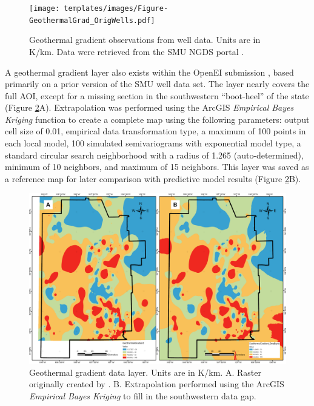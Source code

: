 \begin{figure}[H]
\centering
\texttt{[image: templates/images/Figure-GeothermalGrad\_OrigWells.pdf]}
\caption[Geothermal gradient data layer]{Geothermal gradient observations from well data. Units are in K/km. Data were retrieved from the SMU NGDS portal \protect\citep{smu_geothermal_2021}.}
\label{fig:feat_geotherm_gradient}
\end{figure}
\pagebreak

A geothermal gradient layer also exists within the \citeauthor{bielicki_hydrogeolgic_2015} OpenEI submission \citep{kelley_geothermal_2015}, based primarily on a prior version of the SMU well data set. The layer nearly covers the full AOI, except for a missing section in the southwestern ``boot-heel'' of the state (Figure \ref{fig:feat_pfa_geotherm_gradient}A). Extrapolation was performed using the ArcGIS \textit{Empirical Bayes Kriging} function to create a complete map using the following parameters: output cell size of 0.01, empirical data transformation type, a maximum of 100 points in each local model, 100 simulated semivariograms with exponential model type, a standard circular search neighborhood with a radius of 1.265 (auto-determined), minimum of 10 neighbors, and maximum of 15 neighbors. This layer was saved as a reference map for later comparison with predictive model results (Figure \ref{fig:feat_pfa_geotherm_gradient}B).  

\begin{figure}[H]
\centering
\includegraphics[width=\linewidth]{templates/images/Figure-PFA_Geothermal_Gradient_sidebyside.png}
\caption[Geothermal gradient data layer]{Geothermal gradient data layer. Units are in K/km. A. Raster originally created by \protect\citet{bielicki_hydrogeolgic_2015}. B. Extrapolation performed using the ArcGIS \textit{Empirical Bayes Kriging} to fill in the southwestern data gap.}
\label{fig:feat_pfa_geotherm_gradient}
\end{figure}
